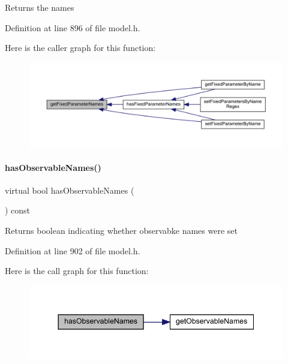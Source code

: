 \begin{DoxyReturn}{Returns}
the names 
\end{DoxyReturn}


Definition at line 896 of file model.\+h.

Here is the caller graph for this function\+:
\nopagebreak
\begin{figure}[H]
\begin{center}
\leavevmode
\includegraphics[width=350pt]{classamici_1_1_model_a40260fd33966dc70d0edfa21bf655012_icgraph}
\end{center}
\end{figure}
\mbox{\label{classamici_1_1_model_aa7b808394713a29e59c434dd7f6a23ac}} 
\paragraph{\texorpdfstring{has\+Observable\+Names()}{hasObservableNames()}}
{\footnotesize\ttfamily virtual bool has\+Observable\+Names (\begin{DoxyParamCaption}{ }\end{DoxyParamCaption}) const\hspace{0.3cm}{\ttfamily [virtual]}}

\begin{DoxyReturn}{Returns}
boolean indicating whether observabke names were set 
\end{DoxyReturn}


Definition at line 902 of file model.\+h.

Here is the call graph for this function\+:
\nopagebreak
\begin{figure}[H]
\begin{center}
\leavevmode
\includegraphics[width=344pt]{classamici_1_1_model_aa7b808394713a29e59c434dd7f6a23ac_cgraph}
\end{center}
\end{figure}
\mbox{\label{classamici_1_1_model_a32b4a0c822a696e388aaa8284bf08059}} 
